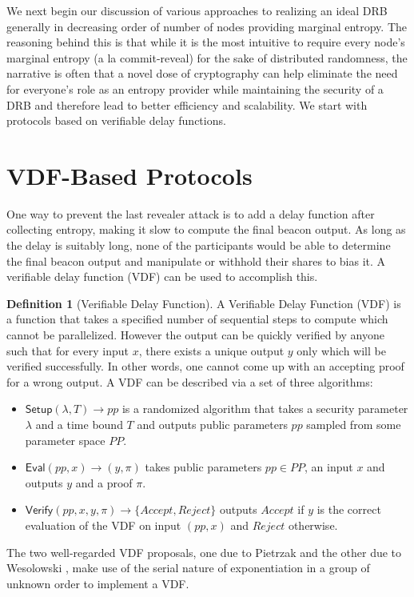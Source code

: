 \documentclass[letterpaper,twocolumn,10pt]{article}
\theoremstyle{definition}
\newtheorem{definition}[theorem]{Definition}
\theoremstyle{remark}
\begin{document}
We next begin our discussion of various approaches to realizing an ideal DRB generally in decreasing order of number of nodes providing marginal entropy. The reasoning behind this is that while it is the most intuitive to require every node's marginal entropy (a la commit-reveal) for the sake of distributed randomness, the narrative is often that a novel dose of cryptography can help eliminate the need for everyone's role as an entropy provider while maintaining the security of a DRB and therefore lead to better efficiency and scalability. We start with protocols based on verifiable delay functions.

\section{VDF-Based Protocols}
\label{section:vdf}
One way to prevent the last revealer attack is to add a delay function after collecting entropy, making it slow to compute the final beacon output. As long as the delay is suitably long, none of the participants would be able to determine the final beacon output and manipulate or withhold their shares to bias it. A verifiable delay function (VDF) \cite{boneh2018verifiable} can be used to accomplish this.
\begin{definition}[Verifiable Delay Function]
A Verifiable Delay Function (VDF) is a function that takes a specified number of sequential steps to compute which cannot be parallelized. However the output can be quickly verified by anyone such that for every input $x$, there exists a unique output $y$ only which will be verified successfully. In other words, one cannot come up with an accepting proof for a wrong output.
A VDF can be described via a set of three algorithms:
\begin{itemize}
\item $\mathsf{Setup}(\lambda, T) \rightarrow pp$ is a randomized algorithm that takes a security parameter $\lambda$ and a time bound $T$ and outputs public parameters $pp$ sampled from some parameter space $PP$.
\item $\mathsf{Eval}(pp, x) \rightarrow (y, \pi)$ takes public parameters $pp\in PP$, an input $x$ and outputs $y$ and a proof $\pi$.
\item $\mathsf{Verify}(pp, x, y, \pi) \rightarrow \{Accept, Reject\}$ outputs $Accept$ if $y$ is the correct evaluation of the VDF on input $(pp, x)$ and $Reject$ otherwise.
\end{itemize}
\end{definition}
 The two well-regarded VDF proposals, one due to Pietrzak \cite{pietrzak2018simple} and the other due to Wesolowski \cite{wesolowski2019efficient}, make use of the serial nature of exponentiation in a group of unknown order to implement a VDF. 
\end{document}
